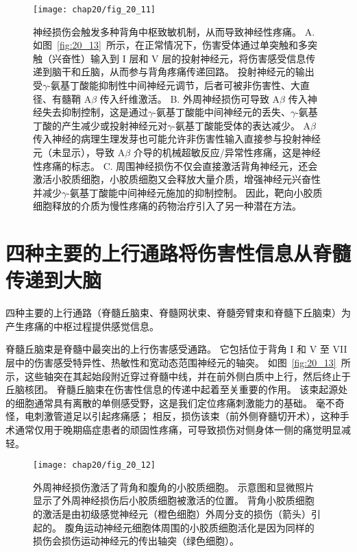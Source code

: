 \begin{figure}[htbp]
	\centering
	\texttt{[image: chap20/fig\_20\_11]}
	\caption{神经损伤会触发多种背角中枢致敏机制，从而导致神经性疼痛。
		A. 如图~\ref{fig:20_13}~所示，在正常情况下，伤害受体通过单突触和多突触（兴奋性）输入到 I 层和 V 层的投射神经元，将伤害感受信息传递到脑干和丘脑，从而参与背角疼痛传递回路。
		投射神经元的输出受$\gamma$-氨基丁酸能抑制性中间神经元调节，后者可被非伤害性、大直径、有髓鞘 A$ \beta $ 传入纤维激活。
		B. 外周神经损伤可导致 A$ \beta $ 传入神经失去抑制控制，这是通过$\gamma$-氨基丁酸能中间神经元的丢失、$\gamma$-氨基丁酸的产生减少或投射神经元对$\gamma$-氨基丁酸能受体的表达减少。
		A$ \beta $ 传入神经的病理生理发芽也可能允许非伤害性输入直接参与投射神经元（未显示），导致 A$ \beta $ 介导的机械超敏反应/异常性疼痛，这是神经性疼痛的标志。
		C. 周围神经损伤不仅会直接激活背角神经元，还会激活小胶质细胞，小胶质细胞又会释放大量介质，增强神经元兴奋性并减少$\gamma$-氨基丁酸能中间神经元施加的抑制控制。
		因此，靶向小胶质细胞释放的介质为慢性疼痛的药物治疗引入了另一种潜在方法。}
	\label{fig:20_11}
\end{figure}



\section{四种主要的上行通路将伤害性信息从脊髓传递到大脑}

四种主要的上行通路（脊髓丘脑束、脊髓网状束、脊髓旁臂束和脊髓下丘脑束）为产生疼痛的中枢过程提供感觉信息。


脊髓丘脑束是脊髓中最突出的上行伤害感受通路。
它包括位于背角 I 和 V 至 VII 层中的伤害感受特异性、热敏性和宽动态范围神经元的轴突。
如图~\ref{fig:20_13}~所示，这些轴突在其起始段附近穿过脊髓中线，并在前外侧白质中上行，然后终止于丘脑核团。
脊髓丘脑束在伤害性信息的传递中起着至关重要的作用。 
该束起源处的细胞通常具有离散的单侧感受野，这是我们定位疼痛刺激能力的基础。
毫不奇怪，电刺激管道足以引起疼痛感；
相反，损伤该束（前外侧脊髓切开术），这种手术通常仅用于晚期癌症患者的顽固性疼痛，可导致损伤对侧身体一侧的痛觉明显减轻。


\begin{figure}[htbp]
	\centering
	\texttt{[image: chap20/fig\_20\_12]}
	\caption{外周神经损伤激活了背角和腹角的小胶质细胞。
		示意图和显微照片显示了外周神经损伤后小胶质细胞被激活的位置。
		背角小胶质细胞的激活是由初级感觉神经元（橙色细胞）外周分支的损伤（箭头）引起的。
		腹角运动神经元细胞体周围的小胶质细胞活化是因为同样的损伤会损伤运动神经元的传出轴突（绿色细胞）。}
	\label{fig:20_12}
\end{figure}


